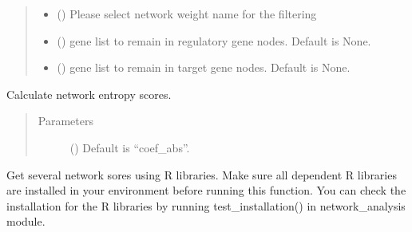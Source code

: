 \documentclass[letterpaper,10pt,english]{sphinxmanual}
\begin{document}
\begin{fulllineitems}
\begin{fulllineitems}
\begin{quote}
\begin{description}
\begin{itemize}
\item {} 
 () \textendash{} Please select network weight name for the filtering

\item {} 
 () \textendash{} gene list to remain in regulatory gene nodes. Default is None.

\item {} 
 () \textendash{} gene list to remain in target gene nodes. Default is None.

\end{itemize}

\end{description}\end{quote}

\end{fulllineitems}


\begin{fulllineitems}
\label{\detokenize{modules/celloracle:celloracle.Links.get_network_entropy}}
Calculate network entropy scores.
\begin{quote}\begin{description}
\item[{Parameters}] \leavevmode
{} () \textendash{} Default is “coef\_abs”.

\end{description}\end{quote}

\end{fulllineitems}


\begin{fulllineitems}
\label{\detokenize{modules/celloracle:celloracle.Links.get_score}}
Get several network sores using R libraries.
Make sure all dependent R libraries are installed in your environment before running this function.
You can check the installation for the R libraries by running test\_installation() in network\_analysis module.


\end{fulllineitems}
\end{fulllineitems}
\end{document}
